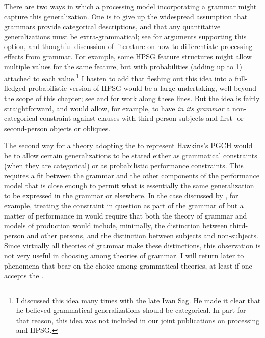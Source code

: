 \documentclass[output=paper
	        ,collection
	        ,collectionchapter
 	        ,biblatex
                ,babelshorthands
                ,newtxmath
                ,draftmode
                ,colorlinks, citecolor=brown
]{langscibook}
\begin{document}
There are two ways in which a processing model incorporating a grammar might capture this generalization.  One is to give up the widespread assumption that grammars provide categorical descriptions, and that any quantitative generalizations must be extra-grammatical; see \citet{FrancisPrep-b} for arguments supporting this option, and thoughful discussion of literature on how to differentiate processing effects from grammar.  For example, some HPSG feature structures might allow multiple values for the same feature, but with probabilities (adding up to 1) attached to each value.\footnote{I discussed this idea many times with the late Ivan Sag.  He made it clear that he believed grammatical generalizations should be categorical.  In part for that reason, this idea was not included in our joint publications on processing and HPSG.}  I hasten to add that fleshing out this idea into a full-fledged probabilistic version of HPSG would be a large undertaking, well beyond the scope of this chapter; see \citet{Linadarki2006} and \citet{MT2008a-u} for work along these lines.  But the idea is fairly straightforward, and would allow, for example,  to have \emph{in its grammar} a non-categorical constraint against clauses with third-person subjects and first- or second-person objects or obliques.  

The second way for a theory adopting the  to represent Hawkins's PGCH would be to allow certain generalizations to be stated either as grammatical constraints (when they are categorical) or as probabilistic performance constraints.  This requires a fit between the grammar and the other components of the performance model that is close enough to permit what is essentially the same generalization to be expressed in the grammar or elsewhere.  In the case discussed by \citeauthor{BresnanEtAl2001}, for example, treating the constraint in question as part of the grammar of  but a matter of performance in  would require that both the theory of grammar and models of production would include, minimally, the distinction between third-person and other persons, and the distinction between subjects and non-subjects.  Since virtually all theories of grammar make these distinctions, this observation is not very useful in choosing among theories of grammar.  I will return later to phenomena that bear on the choice among grammatical theories, at least if one accepts the .
\end{document}
